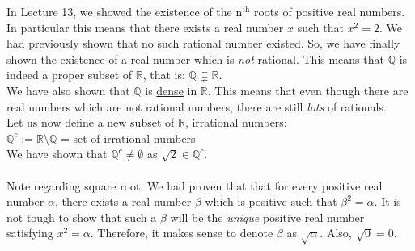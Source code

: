 In Lecture 13, we showed the existence of the n$^\text{th}$ roots of positive real numbers. In particular this means that there exists a real number $x$ such that $x^2 = 2$. We had previously shown that no such rational number existed. So, we have finally shown the existence of a real number which is \textit{not} rational. This means that $\mathbb{Q}$ is indeed a proper subset of $\mathbb{R}$, that is: $\mathbb{Q}\subsetneq\mathbb{R}$.\\
We have also shown that $\mathbb{Q}$ is \hyperref[sec:ratdense]{dense} in $\mathbb{R}$. This means that even though there are real numbers which are not rational numbers, there are still \textit{lots} of rationals.\\
Let us now define a new subset of $\mathbb{R}$, irrational numbers:\\
$\mathbb{Q}^c:=\mathbb{R}\setminus\mathbb{Q}$ = set of irrational numbers\\
We have shown that $\mathbb{Q}^c\neq\emptyset$ as $\sqrt{2}\in\mathbb{Q}^c$.\\~\\
Note regarding square root: We had proven that that for every positive real number $\alpha$, there exists a real number $\beta$ which is positive such that $\beta^2=\alpha$. It is not tough to show that such a $\beta$ will be the \textit{unique} positive real number satisfying $x^2 = \alpha$. Therefore, it makes sense to denote $\beta$ as $\sqrt{\alpha}$. Also, $\sqrt{0} = 0$.
